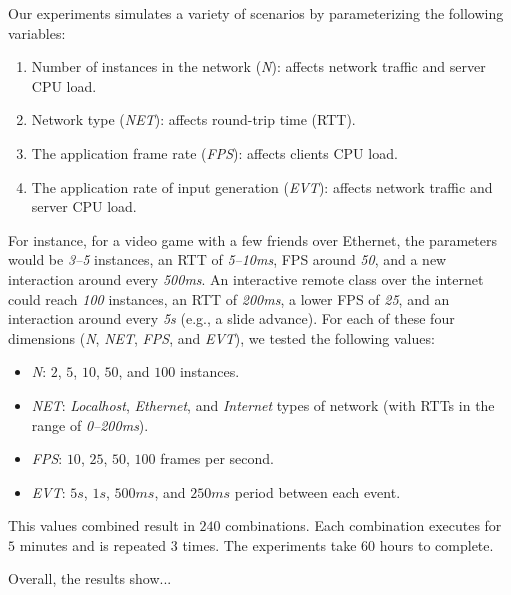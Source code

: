 \documentclass[sigplan,screen]{acmart}
\begin{document}
Our experiments simulates a variety of scenarios by parameterizing the
following variables:
%
\begin{enumerate}
\item Number of instances in the network (\emph{N}):
        affects network traffic and server CPU load.
\item Network type (\emph{NET}):
        affects round-trip time (RTT).
\item The application frame rate (\emph{FPS}):
        affects clients CPU load.
\item The application rate of input generation (\emph{EVT}):
        affects network traffic and server CPU load.
\end{enumerate}
%
For instance, for a video game with a few friends over Ethernet, the parameters
would be
    \emph{3--5} instances,
    an RTT of \emph{5--10ms},
    FPS around \emph{50},
    and a new interaction around every \emph{500ms}.
An interactive remote class over the internet could reach
    \emph{100} instances,
    an RTT of \emph{200ms},
    a lower FPS of \emph{25},
    and an interaction around every \emph{5s} (e.g., a slide advance).
%
For each of these four dimensions (\emph{N}, \emph{NET}, \emph{FPS}, and
\emph{EVT}), we tested the following values:
%
\begin{itemize}
\item \emph{N}: $2$, $5$, $10$, $50$, and $100$ instances.                  %
\item \emph{NET}: \emph{Localhost}, \emph{Ethernet}, and \emph{Internet} types
                  of network (with RTTs in the range of \emph{0--200ms}).   %
\item \emph{FPS}: $10$, $25$, $50$, $100$ frames per second.                %
\item \emph{EVT}: $5s$, $1s$, $500ms$, and $250ms$ period between each event.
\end{itemize}                                                               %
%
This values combined result in $240$ combinations.
Each combination executes for $5$ minutes and is repeated $3$ times.
The experiments take $60$ hours to complete.

Overall, the results show...

\end{document}
